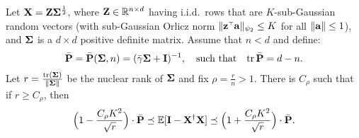 \documentclass[11pt]{article}
\begin{document}
\begin{theorem}\label{t:main}
Let $\mathbf X = \mathbf Z\mathbf{\Sigma}^{\frac12}$, where $\mathbf Z \in \mathbb R^{n\times d}$ having i.i.d.~rows that are $K$-sub-Gaussian random vectors (with sub-Gaussian Orlicz norm $\|\z^\top \a \|_{\psi_2} \leq K$ for all $\|\mathbf a\| \leq 1$), and $\mathbf{\Sigma}$ is a $d\times d$ positive definite matrix. Assume that $n<d$ and define:
\begin{align*}
\bar{\mathbf P}=\bar{\mathbf P}(\mathbf{\Sigma},n) = (\bar\gamma\mathbf{\Sigma} + \mathbf I)^{-1},\quad\text{such that}\quad\mathrm{tr}\,\bar{\mathbf P}=d-n.
\end{align*}
Let $r=\frac{\mathrm{tr}(\mathbf{\Sigma})}{\|\mathbf{\Sigma}\|}$ be the nuclear rank of
$\mathbf{\Sigma}$ and fix $\rho=\frac rn > 1$. There is $C_{\rho}$ such that if $r\geq C_\rho$, then
\begin{align}
\Big(1-\frac {C_\rho K^2}{\sqrt
  r}\Big)\cdot\bar{\mathbf P}\preceq\mathbb E[\mathbf I-\mathbf X^\dagger\mathbf X]\preceq
  \Big(1+\frac {C_\rho K^2}{\sqrt r}\Big)\cdot\bar{\mathbf P}.
\end{align}
\end{theorem}
\end{document}
